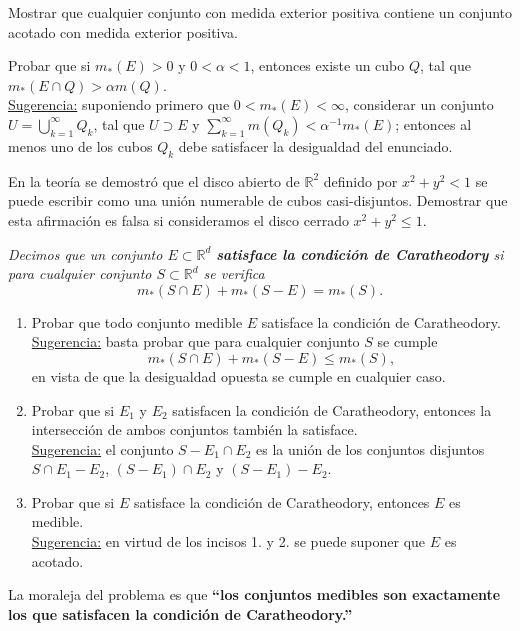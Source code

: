 \documentclass{book}
\newcommand{\rr}{\mathbb{R}}
\newcommand{\di}{\displaystyle}
\begin{document}
 




 \begin{ejer}{}
	Mostrar que cualquier conjunto con medida exterior positiva contiene un conjunto acotado con medida exterior positiva. 
	\end{ejer}
 
  \begin{ejer}{} 
	Probar que si $m_*(E)>0$ y $0<\alpha<1$, entonces existe un cubo $Q$, tal que
  $m_*(E\cap Q)>\alpha m(Q)$.
\\
  \underline{Sugerencia:} suponiendo primero que $0<m_*(E)<\infty$, considerar un conjunto
 $U=\di\bigcup_{k=1}^{\infty}Q_k$, tal que 
  $U\supset E$ y $\sum\limits_{k=1}^{\infty}m(Q_k)<\alpha^{-1} m_*(E)$; entonces al menos uno de los cubos $Q_k$
  debe satisfacer la desigualdad del enunciado.
 \end{ejer} 

\begin{ejer}{}
  En la teoría se demostró que el disco abierto  de $\rr^2$ definido por  $x^2+y^2< 1$ se puede escribir como una unión numerable de cubos casi-disjuntos. Demostrar que esta afirmación es falsa si consideramos el disco cerrado  $x^2+y^2\leq 1$.  
	\end{ejer}






  \begin{ejer} {} 
	{\it{Decimos que un conjunto $E\subset \rr^d$ 
  {\bf{satisface la condición de Caratheodory}}
  si para cualquier conjunto $S\subset \rr^d$ se verifica}} 
  $$m_*(S\cap E)+m_*(S-E)=m_*(S). $$
	\begin{enumerate}   
    \item Probar que todo conjunto medible $E$ satisface la condición de Caratheodory.
    \\
    \underline{Sugerencia:} basta probar que para cualquier conjunto $S$ se cumple
    $$m_*(S\cap E)+m_*(S-E)\leq m_*(S), $$
    en vista de que la desigualdad opuesta se cumple en cualquier caso.
 
    \item Probar que si $E_1$ y $E_2$ satisfacen la condición de Caratheodory, 
    entonces la intersección de ambos conjuntos también la satisface.
    \\
    \underline{Sugerencia:} el conjunto $S-E_1\cap E_2$ es la unión de los conjuntos 
    disjuntos $S\cap E_1-E_2$, $(S-E_1)\cap E_2$ y $(S-E_1)-E_2$.

    \item Probar que si $E$ satisface la condición de Caratheodory, entonces $E$ es medible.
    \\
    \underline{Sugerencia:} en virtud de los incisos  1. y  2. se puede suponer que $E$ es acotado.
	\end{enumerate}
    La moraleja del problema es que 
    {\bf{``los conjuntos medibles son exactamente los que satisfacen
    la condición de Caratheodory.''}}
  \end{ejer} 
	
\end{document}
